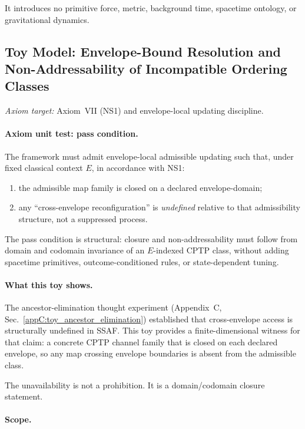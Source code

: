 \documentclass[aps,prx,onecolumn,11pt]{revtex4-2}
\theoremstyle{plain}
\theoremstyle{definition}
\theoremstyle{remark}
\begin{document}
It introduces no primitive force, metric, background time, spacetime
ontology, or gravitational dynamics.

\subsection{Toy Model: Envelope-Bound Resolution and Non-Addressability of Incompatible Ordering Classes}
\label{toy:envelope_bound_resolution_stronger}

\noindent\emph{Axiom target:} Axiom~VII (NS1) and envelope-local updating discipline.

\paragraph{Axiom unit test: pass condition.}

The framework must admit envelope-local admissible updating such that,
under fixed classical context \(E\), in accordance with NS1:

\begin{enumerate}[label=(\roman*), leftmargin=2.2em]
\item the admissible map family is closed on a declared envelope-domain;
\item any ``cross-envelope reconfiguration'' is \emph{undefined}
relative to that admissibility structure, not a suppressed process.
\end{enumerate}

The pass condition is structural: closure and non-addressability must
follow from domain and codomain invariance of an \(E\)-indexed CPTP
class,
without adding spacetime primitives, outcome-conditioned rules, or
state-dependent tuning.

\paragraph{What this toy shows.}

The ancestor-elimination thought experiment
(Appendix~C, Sec.~\ref{appC:toy_ancestor_elimination}) established that
cross-envelope access is structurally undefined in SSAF. This toy
provides a finite-dimensional witness for that claim: a concrete CPTP
channel family that is closed on each declared envelope, so any map
crossing envelope boundaries is absent from the admissible class.

The unavailability is not a prohibition. It is a domain/codomain
closure statement.

\paragraph{Scope.}
\end{document}
